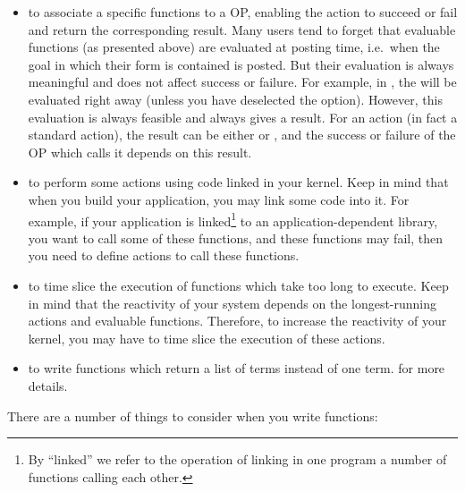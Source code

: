 \begin{itemize}

\item to associate a specific functions to a OP, enabling the action to
succeed or fail and return the corresponding
result. Many users tend to forget that evaluable functions (as presented
above) are evaluated at posting time, i.e.\ when the goal in which their
form is contained is posted. But their evaluation is always meaningful and
does not affect success or failure. For example, in , the    will be evaluated right away (unless you have
deselected the  option). However, this evaluation is
always feasible and always gives a result. For an action (in fact a
standard action), the result can  be either  or , and
the success or failure of the OP which calls it depends on this result.

\item to perform some actions using code linked in your kernel. Keep in
mind that when you build your application, you may link some
code into it. For example, if your application is linked\footnote{By ``linked'' we
refer to the operation of linking in one program a number of functions calling
each other.} to an application-dependent library, you want to
call some of these functions, and these functions may fail, then you need to define
actions to call these functions.

\item to time slice the execution of functions which take too long to
execute. Keep in mind that the reactivity of your system depends on the
longest-running actions and evaluable functions. Therefore, to
increase the reactivity of your kernel, you may have to time slice the
execution of these actions.

\item to write functions which return a list of terms instead of one
term.  for more details.

\end{itemize}

There are a number of things to consider when you write functions:

